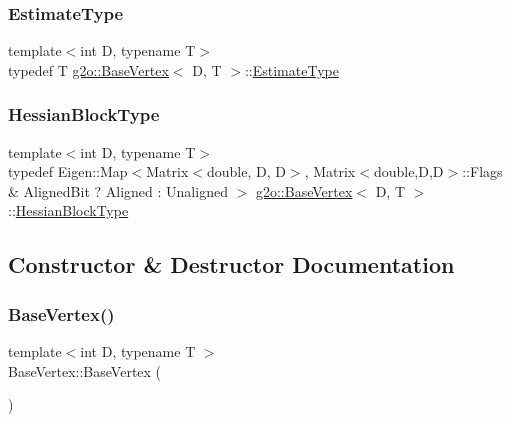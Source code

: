 \mbox{\label{classg2o_1_1_base_vertex_aaffb179a0d591da4769ec7c3fc7f7daa}} 
\subsubsection{\texorpdfstring{Estimate\+Type}{EstimateType}}
{\footnotesize\ttfamily template$<$int D, typename T$>$ \\
typedef T \mbox{\hyperlink{classg2o_1_1_base_vertex}{g2o\+::\+Base\+Vertex}}$<$ D, T $>$\+::\mbox{\hyperlink{classg2o_1_1_base_vertex_aaffb179a0d591da4769ec7c3fc7f7daa}{Estimate\+Type}}}

\mbox{\label{classg2o_1_1_base_vertex_a887928bc60710e0ec9acb269ee7411db}} 
\subsubsection{\texorpdfstring{Hessian\+Block\+Type}{HessianBlockType}}
{\footnotesize\ttfamily template$<$int D, typename T$>$ \\
typedef Eigen\+::\+Map$<$Matrix$<$double, D, D$>$, Matrix$<$double,D,D$>$\+::Flags \& Aligned\+Bit ? Aligned \+: Unaligned $>$ \mbox{\hyperlink{classg2o_1_1_base_vertex}{g2o\+::\+Base\+Vertex}}$<$ D, T $>$\+::\mbox{\hyperlink{classg2o_1_1_base_vertex_a887928bc60710e0ec9acb269ee7411db}{Hessian\+Block\+Type}}}



\subsection{Constructor \& Destructor Documentation}
\mbox{\label{classg2o_1_1_base_vertex_a40fcd78e21bb4aedf7e299922c650937}} 
\subsubsection{\texorpdfstring{Base\+Vertex()}{BaseVertex()}}
{\footnotesize\ttfamily template$<$int D, typename T $>$ \\
Base\+Vertex\+::\+Base\+Vertex (\begin{DoxyParamCaption}{ }\end{DoxyParamCaption})}



